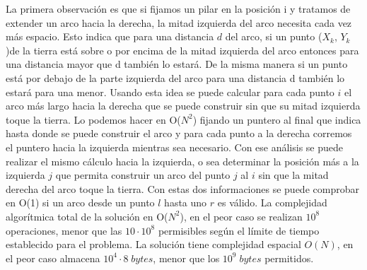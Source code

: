 \documentclass{report}
\begin{document}
La primera observaci\'on es que si fijamos un pilar en la posici\'on i y tratamos de extender un arco hacia la derecha, la mitad izquierda del arco necesita cada vez m\'as espacio. Esto indica que para una distancia $d$ del arco, si un punto ($X_k$, $Y_k$)de la tierra est\'a sobre o por encima de la mitad izquierda del arco entonces para una distancia mayor que d tambi\'en lo estar\'a. De la misma manera si un punto est\'a por debajo de la parte izquierda del arco para una distancia d tambi\'en lo estar\'a para una menor. Usando esta idea se puede calcular para cada punto $i$ el arco m\'as largo hacia la derecha que se puede construir sin que su mitad izquierda toque la tierra. Lo podemos hacer en O($N^2$) fijando un puntero al final que indica hasta donde se puede construir el arco y para cada punto a la derecha corremos el puntero hacia la izquierda mientras sea necesario. Con ese an\'alisis se puede realizar el mismo c\'alculo hacia la izquierda, o sea determinar la posici\'on m\'as a la izquierda $j$ que permita construir un arco del punto $j$ al $i$ sin que la mitad derecha del arco toque la tierra. Con estas dos informaciones se puede comprobar en O(1) si un arco desde un punto $l$ hasta uno $r$ es v\'alido. La complejidad algor\'itmica total de la soluci\'on en O($N^2$), en el peor caso se realizan $10^8$ operaciones, menor que las $10 \cdot 10^8$ permisibles seg\'un el l\'imite de tiempo establecido para el problema. La soluci\'on tiene complejidad espacial $O(N)$, en el peor caso almacena $10^4 \cdot 8\; bytes$, menor que los $10^9 \;bytes$ permitidos.\\  
\end{document}
